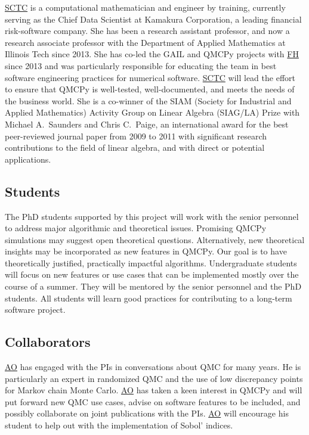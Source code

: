 \documentclass[11pt]{NSFamsart}
\newcommand{\FH}{\hyperlink{FHlink}{FH}\xspace}
\newcommand{\SCTC}{\hyperlink{SCTClink}{SCTC}\xspace}
\newcommand{\AO}{\hyperlink{AOlink}{AO}\xspace}
\begin{document}
\SCTC is a computational mathematician and engineer by training, currently serving as the Chief Data Scientist at Kamakura Corporation, a leading financial risk-software company.  She has been a research assistant professor, and now a research associate professor with the Department of Applied Mathematics at Illinois Tech since 2013.  She has co-led the GAIL and QMCPy projects with \FH  since 2013 and was particularly responsible for educating the team in best software engineering practices for numerical software.  \SCTC will lead the effort to ensure that QMCPy is well-tested, well-documented, and meets the needs of the business world. She is a co-winner of the SIAM (Society for Industrial and Applied Mathematics) Activity Group on Linear Algebra (SIAG/LA) Prize with Michael A.~Saunders and Chris C.~Paige, an international
award for the best peer-reviewed journal paper from 2009 to 2011 with significant research contributions to the field of linear algebra, and with direct or potential applications.


\subsection{Students}  The PhD students supported by this project will work with the senior personnel to address major algorithmic and theoretical issues.  Promising QMCPy simulations may suggest open theoretical questions.  Alternatively, new theoretical insights may be incorporated as new features in QMCPy.  Our goal is to have theoretically justified, practically impactful algorithms.  Undergraduate students will focus on new features or use cases that can be implemented mostly over the course of a summer.  They will be mentored by the senior personnel and the PhD students.  All students will learn good practices for contributing to a long-term software project.

\subsection{Collaborators}
\AO has engaged with the PIs in conversations about QMC for many years.  He is particularly an expert in randomized QMC and the use of low discrepancy points for Markov chain Monte Carlo.  \AO has taken a keen interest in QMCPy and will put forward new QMC use cases, advise on software features to be included, and possibly collaborate on joint publications with the PIs.  \AO will encourage his student to help out with the implementation of Sobol' indices.
\end{document}
